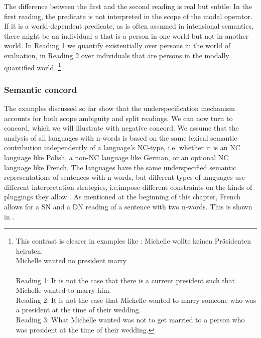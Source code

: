 \documentclass[output=paper]{langsci/langscibook}
\begin{document}
The difference between the first and the second reading is real but subtle: In the first reading, the predicate  is not interpreted in the scope of the modal operator. If it is a world-dependent predicate, as is often assumed in intensional semantics, there might be an individual $a$ that is a person in one world but not in another world. In Reading 1 we quantify existentially over persons in the world of evaluation, in Reading 2 over individuals that are persons in the modally quantified world.%
\footnote {
This contrast is clearer in examples like :
\ea \label{modal-not}
\gll Michelle wollte keinen Präsidenten heiraten.\\
Michelle wanted no president marry\\
\glt {}\\
Reading 1: It is not the case that there is a current president such that Michelle wanted to marry him.\\
Reading 2: It is not the case that Michelle wanted to marry someone who was a president at the time of their wedding.\\
Reading 3: What Michelle wanted was not to get married to a person who was president at the time of their wedding.
\z 
}

\subsubsection{Semantic concord}
\label{Sec-LRS-NC}

The examples discussed so far show that the underspecification mechanism accounts for both scope ambiguity and split readings. 
We can now turn to concord, which we will illustrate with negative concord.
We assume that the analysis of all languages with n-words is based on 
the same lexical semantic contribution independently of a language's NC-type, i.e. whether it is an NC language like Polish, a non-NC language like German, or an optional NC language like French.
The languages have the same underspecified semantic representations of sentences with n-words, but different types of languages use different interpretation strategies, i.e.\@ impose different constraints on the kinds of pluggings they allow \citep{Richter:Sailer:06}. As mentioned at the beginning of this chapter, French allows for a SN and a DN reading of a sentence with two n-words. This is shown in .
\end{document}
